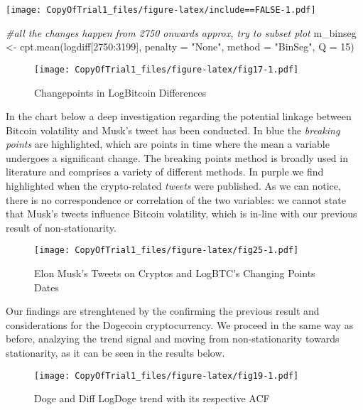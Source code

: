\documentclass[
]{article}
\newenvironment{Shaded}{\begin{snugshade}}{\end{snugshade}}
\newcommand{\AttributeTok}[1]{\textcolor[rgb]{0.77,0.63,0.00}{#1}}
\newcommand{\CommentTok}[1]{\textcolor[rgb]{0.56,0.35,0.01}{\textit{#1}}}
\newcommand{\DecValTok}[1]{\textcolor[rgb]{0.00,0.00,0.81}{#1}}
\newcommand{\FunctionTok}[1]{\textcolor[rgb]{0.00,0.00,0.00}{#1}}
\newcommand{\NormalTok}[1]{#1}
\newcommand{\OtherTok}[1]{\textcolor[rgb]{0.56,0.35,0.01}{#1}}
\newcommand{\SpecialCharTok}[1]{\textcolor[rgb]{0.00,0.00,0.00}{#1}}
\newcommand{\StringTok}[1]{\textcolor[rgb]{0.31,0.60,0.02}{#1}}
\begin{document}
\texttt{[image: CopyOfTrial1\_files/figure-latex/include==FALSE-1.pdf]}

\begin{Shaded}
\begin{Highlighting}[]
\CommentTok{\#all the changes happen from 2750 onwards approx, try to subset plot}
\NormalTok{m\_binseg }\OtherTok{\textless{}{-}} \FunctionTok{cpt.mean}\NormalTok{(logdiff[}\DecValTok{2750}\SpecialCharTok{:}\DecValTok{3199}\NormalTok{], }\AttributeTok{penalty =} \StringTok{"None"}\NormalTok{, }\AttributeTok{method =} \StringTok{"BinSeg"}\NormalTok{, }\AttributeTok{Q =} \DecValTok{15}\NormalTok{)}
\end{Highlighting}
\end{Shaded}

\begin{figure}
\centering
\texttt{[image: CopyOfTrial1\_files/figure-latex/fig17-1.pdf]}
\caption{\label{fig:fig17}Changepoints in LogBitcoin Differences}
\end{figure}

In the chart below a deep investigation regarding the potential linkage
between Bitcoin volatility and Musk's tweet has been conducted. In blue
the \emph{breaking points} are highlighted, which are points in time
where the mean a variable undergoes a significant change. The breaking
points method is broadly used in literature and comprises a variety of
different methods. In purple we find highlighted when the crypto-related
\emph{tweets} were published. As we can notice, there is no
correspondence or correlation of the two variables: we cannot state that
Musk's tweets influence Bitcoin volatility, which is in-line with our
previous result of non-stationarity.

\begin{figure}
\centering
\texttt{[image: CopyOfTrial1\_files/figure-latex/fig25-1.pdf]}
\caption{\label{fig:fig25}Elon Musk's Tweets on Cryptos and LogBTC's
Changing Points Dates}
\end{figure}

Our findings are strenghtened by the confirming the previous result and
considerations for the Dogecoin cryptocurrency. We proceed in the same
way as before, analzying the trend signal and moving from
non-stationarity towards stationarity, as it can be seen in the results
below.

\begin{figure}
\centering
\texttt{[image: CopyOfTrial1\_files/figure-latex/fig19-1.pdf]}
\caption{\label{fig:fig19}Doge and Diff LogDoge trend with its
respective ACF}
\end{figure}
\end{document}
